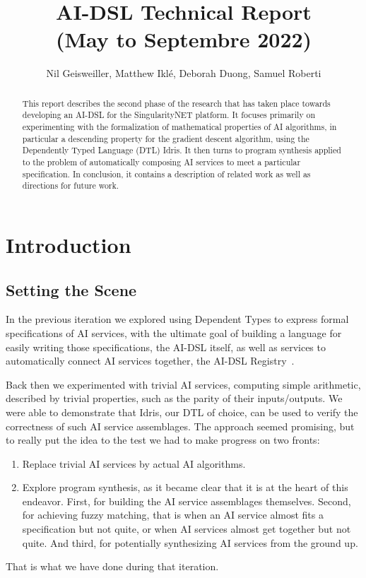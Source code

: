 \documentclass[]{report}
\begin{document}
\title{AI-DSL Technical Report\\(May to Septembre 2022)
}
\author{Nil Geisweiller, Matthew Ikl\'e, Deborah Duong, Samuel Roberti}
\maketitle

\begin{abstract}
  This report describes the second phase of the research that has
  taken place towards developing an AI-DSL for the SingularityNET
  platform.  It focuses primarily on experimenting with the
  formalization of mathematical properties of AI algorithms, in
  particular a descending property for the gradient descent algorithm,
  using the Dependently Typed Language (DTL) Idris.  It then turns to
  program synthesis applied to the problem of automatically composing
  AI services to meet a particular specification.  In conclusion, it
  contains a description of related work as well as directions for
  future work.
\end{abstract}

\tableofcontents

\chapter{Introduction}

\section{Setting the Scene}

In the previous iteration we explored using Dependent Types to express
formal specifications of AI services, with the ultimate goal of
building a language for easily writing those specifications, the
AI-DSL itself, as well as services to automatically connect AI
services together, the AI-DSL Registry~\cite{AIDSLReport2021}.

Back then we experimented with trivial AI services, computing simple
arithmetic, described by trivial properties, such as the parity of
their inputs/outputs.  We were able to demonstrate that Idris, our DTL
of choice, can be used to verify the correctness of such AI service
assemblages.  The approach seemed promising, but to really put the
idea to the test we had to make progress on two fronts:

\begin{enumerate}
\item Replace trivial AI services by actual AI algorithms.
\item Explore program synthesis, as it became clear that it is at the
  heart of this endeavor.  First, for building the AI service
  assemblages themselves.  Second, for achieving fuzzy matching, that
  is when an AI service almost fits a specification but not quite, or
  when AI services almost get together but not quite.  And third, for
  potentially synthesizing AI services from the ground up.
\end{enumerate}
That is what we have done during that iteration.
\end{document}

